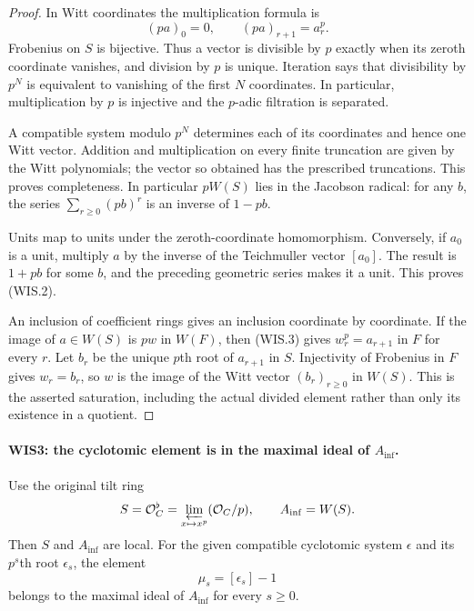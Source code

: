 \begin{proof}
In Witt coordinates the multiplication formula is
\[
          (pa)_0=0,\qquad (pa)_{r+1}=a_r^p.                 \tag{WIS.3}
\]
Frobenius on $S$ is bijective. Thus a vector is divisible by $p$
exactly when its zeroth coordinate vanishes, and division by $p$
is unique. Iteration says that divisibility by $p^N$ is equivalent
to vanishing of the first $N$ coordinates. In particular,
multiplication by $p$ is injective and the $p$-adic filtration is
separated.

A compatible system modulo $p^N$ determines each of its coordinates
and hence one Witt vector. Addition and multiplication on every
finite truncation are given by the Witt polynomials; the vector
so obtained has the prescribed truncations. This proves
completeness. In particular $pW(S)$ lies in the Jacobson radical:
for any $b$, the series $\sum_{r\geq0}(pb)^r$ is an inverse of
$1-pb$.

Units map to units under the zeroth-coordinate homomorphism.
Conversely, if $a_0$ is a unit, multiply $a$ by the inverse of
the Teichmuller vector $[a_0]$. The result is $1+pb$ for some
$b$, and the preceding geometric series makes it a unit.
This proves (WIS.2).

An inclusion of coefficient rings gives an inclusion coordinate
by coordinate. If the image of $a\in W(S)$ is $pw$ in $W(F)$,
then (WIS.3) gives $w_r^p=a_{r+1}$ in $F$ for every $r$.
Let $b_r$ be the unique $p$th root of $a_{r+1}$ in $S$.
Injectivity of Frobenius in $F$ gives $w_r=b_r$, so
$w$ is the image of the Witt vector $(b_r)_{r\geq0}$ in $W(S)$.
This is the asserted saturation, including the actual divided
element rather than only its existence in a quotient.
\end{proof}

\paragraph{WIS3: the cyclotomic element is in the maximal ideal of $A_{\inf}$.}
\label{claim:WIS3}
Use the original tilt ring
\[
 S=\mathcal O_C^\flat
   =\varprojlim_{x\mapsto x^p}(\mathcal O_C/p),\qquad
 A_{\inf}=W(S).
\]
Then $S$ and $A_{\inf}$ are local. For the given compatible
cyclotomic system $\epsilon$ and its $p^s$th root $\epsilon_s$,
the element
\[
                         \mu_s=[\epsilon_s]-1             \tag{WIS.4}
\]
belongs to the maximal ideal of $A_{\inf}$ for every $s\geq0$.

